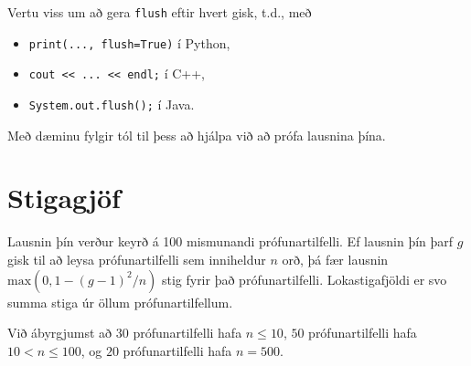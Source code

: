 Vertu viss um að gera \texttt{flush} eftir hvert gisk, t.d., með
\begin{itemize}
    \item \texttt{print(..., flush=True)} í Python,
    \item \texttt{cout << ... << endl;} í C++,
    \item \texttt{System.out.flush();} í Java.
\end{itemize}

Með dæminu fylgir tól til þess að hjálpa við að prófa lausnina þína.

\section*{Stigagjöf}
Lausnin þín verður keyrð á 100 mismunandi prófunartilfelli. Ef lausnin þín þarf
$g$ gisk til að leysa prófunartilfelli sem inniheldur $n$ orð, þá fær lausnin
$\mathrm{max}(0, 1 - (g-1)^2/n)$ stig fyrir það prófunartilfelli.
Lokastigafjöldi er svo summa stiga úr öllum prófunartilfellum.

Við ábyrgjumst að $30$ prófunartilfelli hafa $n\leq 10$, $50$ prófunartilfelli
hafa $10 < n \leq 100$, og $20$ prófunartilfelli hafa $n = 500$.


